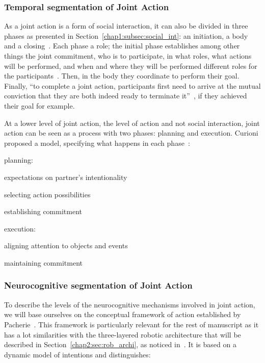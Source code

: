 \documentclass[a4paper,11pt,twoside]{StyleThese}
\begin{document}
\subsubsection{Temporal segmentation of Joint Action}
As a joint action is a form of social interaction, it can also be divided in three phases as presented in Section~\ref{chap1:subsec:social_int}: an initiation, a body and a closing~\cite{heesen_2017_social}. Each phase a role; the initial phase establishes among other things the joint commitment, \ie who is to participate, in what roles, what actions will be performed, and when and where they will be performed different roles for the participants~\cite{clark_2006_social}. Then, in the body they coordinate to perform their goal. Finally, ``to complete a joint action, participants first need to arrive at the mutual conviction that they are both indeed ready to terminate it''~\cite{heesen_2017_social}, if they achieved their goal for example.

At a lower level of joint action, the level of action and not social interaction, joint action can be seen as a process with two phases: planning and execution. Curioni \etal{} proposed a model, specifying what happens in each phase~\cite{curioni_2017_joint}: 
\begin{bulletList}
	\item planning: 
	\begin{bulletList}
		\item expectations on partner's intentionality
		\item selecting action possibilities
		\item establishing commitment
	\end{bulletList}
	\item execution:
	\begin{bulletList}
		\item aligning attention to objects and events
		\item maintaining commitment
	\end{bulletList}
\end{bulletList}
\subsubsection{Neurocognitive segmentation of Joint Action}

To describe the levels of the neurocognitive mechanisms involved in joint action, we will base ourselves on the conceptual framework of action established by Pacherie~\cite{pacherie_2008_phenomenology}. This framework is particularly relevant for the rest of manuscript as it has a lot similarities with the three-layered robotic architecture that will be described in Section~\ref{chap2:sec:rob_archi}, as noticed in~\cite{clodic_2017_key}. It is based on a dynamic model of intentions and distinguishes:
\end{document}
